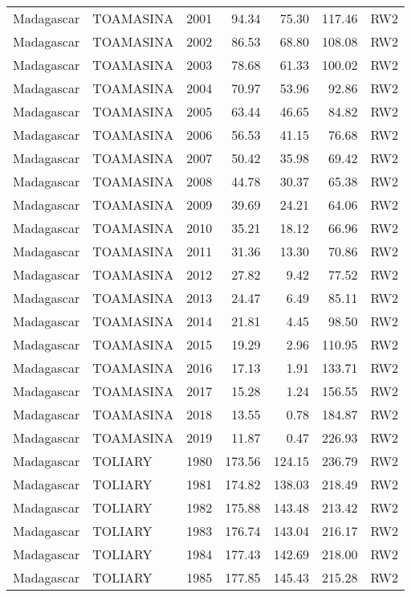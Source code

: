 \begin{longtable}{lllrrrl}
  Madagascar & TOAMASINA & 2001 & 94.34 & 75.30 & 117.46 & RW2 \\ 
  Madagascar & TOAMASINA & 2002 & 86.53 & 68.80 & 108.08 & RW2 \\ 
  Madagascar & TOAMASINA & 2003 & 78.68 & 61.33 & 100.02 & RW2 \\ 
  Madagascar & TOAMASINA & 2004 & 70.97 & 53.96 & 92.86 & RW2 \\ 
  Madagascar & TOAMASINA & 2005 & 63.44 & 46.65 & 84.82 & RW2 \\ 
  Madagascar & TOAMASINA & 2006 & 56.53 & 41.15 & 76.68 & RW2 \\ 
  Madagascar & TOAMASINA & 2007 & 50.42 & 35.98 & 69.42 & RW2 \\ 
  Madagascar & TOAMASINA & 2008 & 44.78 & 30.37 & 65.38 & RW2 \\ 
  Madagascar & TOAMASINA & 2009 & 39.69 & 24.21 & 64.06 & RW2 \\ 
  Madagascar & TOAMASINA & 2010 & 35.21 & 18.12 & 66.96 & RW2 \\ 
  Madagascar & TOAMASINA & 2011 & 31.36 & 13.30 & 70.86 & RW2 \\ 
  Madagascar & TOAMASINA & 2012 & 27.82 & 9.42 & 77.52 & RW2 \\ 
  Madagascar & TOAMASINA & 2013 & 24.47 & 6.49 & 85.11 & RW2 \\ 
  Madagascar & TOAMASINA & 2014 & 21.81 & 4.45 & 98.50 & RW2 \\ 
  Madagascar & TOAMASINA & 2015 & 19.29 & 2.96 & 110.95 & RW2 \\ 
  Madagascar & TOAMASINA & 2016 & 17.13 & 1.91 & 133.71 & RW2 \\ 
  Madagascar & TOAMASINA & 2017 & 15.28 & 1.24 & 156.55 & RW2 \\ 
  Madagascar & TOAMASINA & 2018 & 13.55 & 0.78 & 184.87 & RW2 \\ 
  Madagascar & TOAMASINA & 2019 & 11.87 & 0.47 & 226.93 & RW2 \\ 
  Madagascar & TOLIARY & 1980 & 173.56 & 124.15 & 236.79 & RW2 \\ 
  Madagascar & TOLIARY & 1981 & 174.82 & 138.03 & 218.49 & RW2 \\ 
  Madagascar & TOLIARY & 1982 & 175.88 & 143.48 & 213.42 & RW2 \\ 
  Madagascar & TOLIARY & 1983 & 176.74 & 143.04 & 216.17 & RW2 \\ 
  Madagascar & TOLIARY & 1984 & 177.43 & 142.69 & 218.00 & RW2 \\ 
  Madagascar & TOLIARY & 1985 & 177.85 & 145.43 & 215.28 & RW2 \\ 

\end{longtable}
